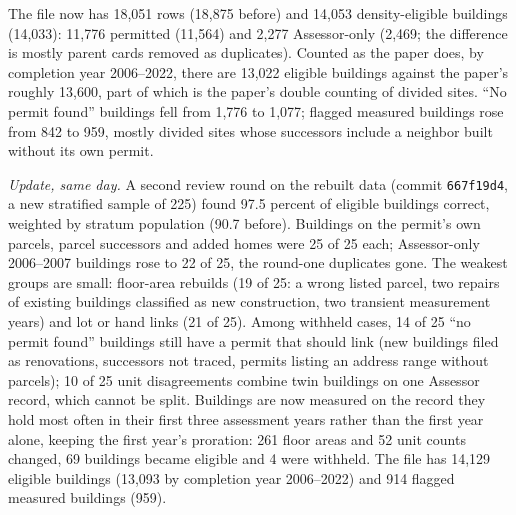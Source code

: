 The file now has 18,051 rows (18,875 before) and 14,053 density-eligible buildings (14,033): 11,776 permitted
(11,564) and 2,277 Assessor-only (2,469; the difference is mostly parent cards removed as duplicates). Counted as
the paper does, by completion year 2006--2022, there are 13,022 eligible buildings against the paper's roughly
13,600, part of which is the paper's double counting of divided sites. ``No permit found'' buildings fell from
1,776 to 1,077; flagged measured buildings rose from 842 to 959, mostly divided sites whose successors include a
neighbor built without its own permit.

\textit{Update, same day.} A second review round on the rebuilt data (commit \texttt{667f19d4}, a new stratified
sample of 225) found 97.5 percent of eligible buildings correct, weighted by stratum population (90.7 before).
Buildings on the permit's own parcels, parcel successors and added homes were 25 of 25 each; Assessor-only
2006--2007 buildings rose to 22 of 25, the round-one duplicates gone. The weakest groups are small: floor-area
rebuilds (19 of 25: a wrong listed parcel, two repairs of existing buildings classified as new construction, two
transient measurement years) and lot or hand links (21 of 25). Among withheld cases, 14 of 25 ``no permit found''
buildings still have a permit that should link (new buildings filed as renovations, successors not traced, permits
listing an address range without parcels); 10 of 25 unit disagreements combine twin buildings on one Assessor record,
which cannot be split. Buildings are now measured on the record they hold most often in their first three assessment
years rather than the first year alone, keeping the first year's proration: 261 floor areas and 52 unit counts
changed, 69 buildings became eligible and 4 were withheld. The file has 14,129 eligible buildings (13,093 by
completion year 2006--2022) and 914 flagged measured buildings (959).

